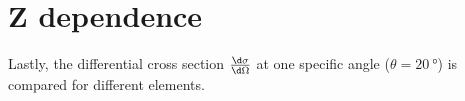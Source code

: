 
\section{Z dependence}
\label{sec:z-dependence}

Lastly, the differential cross section $\frac{\d\sigma}{\d\Omega}$ at one specific
angle ($\theta = \SI{20}{\degree}$) is compared for different elements. 


